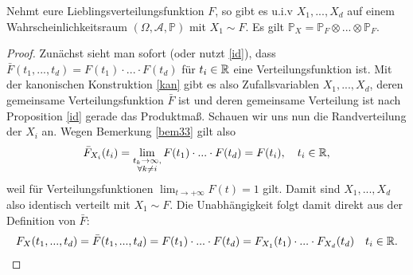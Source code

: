 \begin{satz}\label{abc}
	Nehmt eure Lieblingsverteilungsfunktion $F$, so gibt es u.i.v $X_1,...,X_d$ auf einem Wahrscheinlichkeitsraum $(\Omega, \mathcal A, \mathbb P)$ mit $X_1 \sim F$. Es gilt $\mathbb P_X=\mathbb P_F\otimes ... \otimes \mathbb P_F$.	
\end{satz}		
\begin{proof}
Zun\"achst sieht man sofort (oder nutzt \ref{id}), dass $\bar F(t_1,...,t_d)=F(t_1)\cdot...\cdot F(t_d)$ f\"ur $t_i\in\mathbb{R}$ eine Verteilungsfunktion ist. Mit der kanonischen Konstruktion \ref{kan} gibt es also Zufallsvariablen $X_1,...,X_d$, deren gemeinsame Verteilungsfunktion $\bar F$ ist und deren gemeinsame Verteilung ist nach Proposition \ref{id} gerade das Produktma\ss. Schauen wir uns nun die Randverteilung der $X_i$ an. Wegen Bemerkung \ref{bem33} gilt also
\begin{align*}
	\bar F_{X_i}(t_i) =\lim\limits_{\substack{t_k \to \infty,\\ \forall k\neq i}} F(t_1)\cdot ... \cdot F(t_d)=F(t_i), \quad t_i\in\mathbb{R},
\end{align*}
weil f\"ur Verteilungsfunktionen $\lim_{t\to+\infty} F(t)=1$ gilt. Damit sind $X_1,...,X_d$ also identisch verteilt mit $X_1\sim F$. Die Unabh\"angigkeit folgt damit direkt aus der Definition von $\bar F$:
\begin{align*}
	F_X(t_1,...,t_d)=\bar F(t_1,...,t_d)= F(t_1)\cdot ... \cdot F(t_d)= F_{X_1}(t_1)\cdot ... \cdot F_{X_d}(t_d)\quad t_i\in\mathbb{R}.
\end{align*}
\end{proof}
